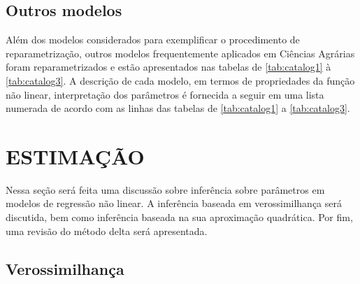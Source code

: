 \subsection{Outros modelos}

Além dos modelos considerados para exemplificar o procedimento de
reparametrização, outros modelos frequentemente aplicados em Ciências
Agrárias foram reparametrizados e estão apresentados nas tabelas de
\ref{tab:catalog1} à \ref{tab:catalog3}. A descrição de cada modelo,
em termos de propriedades da função não linear, interpretação dos
parâmetros é fornecida a seguir em uma lista numerada de acordo com as
linhas das tabelas de \ref{tab:catalog1} a \ref{tab:catalog3}.

\def\captabelas{Reparametrizações desenvolvidas com ênfase na
  interpretação dos parâmetros de modelos de regressão não linear
  aplicados em Ciências Agrárias}

\begin{sidewaystable}
 \caption{\captabelas}\label{tab:catalog1}
\begin{small}
 
\end{small}
\end{sidewaystable}

\begin{sidewaystable}
 \caption{(cont.) \captabelas.}\label{tab:catalog2}
\begin{small}
 
\end{small}
\end{sidewaystable}

\begin{sidewaystable}
 \caption{(cont.) \captabelas.}\label{tab:catalog3}
\begin{small}
 
\end{small}
\end{sidewaystable}

\newpage
\section{ESTIMAÇÃO}

Nessa seção será feita uma discussão sobre inferência sobre parâmetros
em modelos de regressão não linear. A inferência baseada em
verossimilhança será discutida, bem como inferência baseada na sua
aproximação quadrática. Por fim, uma revisão do método delta será
apresentada.

\subsection{Verossimilhança}

